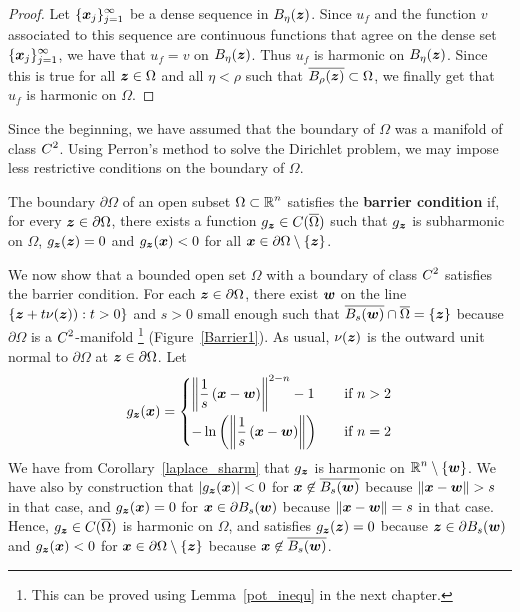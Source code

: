 \begin{proof}
Let $\displaystyle \{{\bm{x}}_j\}_{j=1}^\infty$ be a dense sequence in 
$B_\eta({\bm{z}})$.  Since $u_f$ and the function $v$ associated to
this sequence are continuous functions that agree on the dense set
$\displaystyle \{{\bm{x}}_j\}_{j=1}^\infty$, we have that
$u_f = v$ on $B_\eta({\bm{z}})$.  Thus $u_f$ is harmonic on
$B_\eta({\bm{z}})$.  Since this is true for all ${\bm{z}} \in \Omega$
and all $\eta < \rho$ such that $\overline{B_\rho({\bm{z}})} \subset
\Omega$, we finally get that $u_f$ is harmonic on $\Omega$.
\end{proof}

Since the beginning, we have assumed that the boundary of $\Omega$ was
a manifold of class $\displaystyle C^2$.  Using Perron's method to
solve the Dirichlet problem, we may impose less restrictive conditions
on the boundary of $\Omega$.

\begin{defn}
The boundary $\partial \Omega$ of an open subset
$\displaystyle \Omega \subset \mathbb{R}^n$
satisfies the {\bfseries barrier condition}
if, for every ${\bm{z}} \in \partial \Omega$, there exists a function
$g_{{\bm{z}}} \in C(\overline{\Omega})$ such that
$g_{{\bm{z}}}$ is subharmonic on $\Omega$, $g_{{\bm{z}}}({\bm{z}}) = 0$
and $g_{{\bm{z}}}({\bm{x}}) < 0$ for all
${\bm{x}} \in \partial \Omega \setminus \{{\bm{z}}\}$.
\end{defn}

We now show that a bounded open set $\Omega$ with a boundary of class
$\displaystyle C^2$ satisfies the barrier condition.   For each
${\bm{z}} \in \partial \Omega$, there exist ${\bm{w}}$ on the line
$\displaystyle \{ {\bm{z}} + t\nu({\bm{z}})) : t > 0 \}$
and $s>0$ small enough such that
$\displaystyle \overline{B_s({\bm{w}})} \cap \overline{\Omega} = \{{\bm{z}}\}$
because $\partial \Omega$ is a
$\displaystyle C^2$-manifold \footnote{This can be
proved using Lemma~\ref{pot_inequ} in the next chapter.}
(Figure~\ref{Barrier1}).  As usual, $\nu({\bm{z}})$ is the
outward unit normal to $\partial \Omega$ at
${\bm{z}} \in \partial \Omega$.  Let
\[
g_{{\bm{z}}}({\bm{x}})
= \begin{cases}
\displaystyle \left\| \frac{1}{s}\,({\bm{x}}-{\bm{w}}) \right\|^{2-n} - 1
& \quad \text{if} \ n > 2 \\[0.8em]
\displaystyle
-\ln\left(\left\| \frac{1}{s}\, ({\bm{x}} - {\bm{w}}) \right\|\right)
& \quad \text{if} \ n = 2
\end{cases}
\]
We have from Corollary~\ref{laplace_sharm} that
$g_{{\bm{z}}}$ is harmonic on $\displaystyle \mathbb{R}^n\setminus \{{\bm{w}}\}$.
We have also by construction that
$\displaystyle |g_{{\bm{z}}}({\bm{x}})| < 0$ for
${\bm{x}} \not\in \overline{B_s({\bm{w}})}$ because
$\|{\bm{x}} - {\bm{w}}\| > s$ in that case, and
$\displaystyle g_{{\bm{z}}}({\bm{x}}) = 0$ for
${\bm{x}} \in \partial B_s({\bm{w}})$ because
$\|{\bm{x}} - {\bm{w}}\| = s$ in that case.
Hence, $g_{{\bm{z}}} \in C(\overline{\Omega})$ is harmonic on
$\Omega$, and satisfies $g_{{\bm{z}}}({\bm{z}}) = 0$ because
${\bm{z}} \in \partial B_s({\bm{w}})$ and $g_{{\bm{z}}}({\bm{x}}) < 0$ for 
${\bm{x}} \in \partial \Omega \setminus \{{\bm{z}}\}$ because
${\bm{x}} \not\in \overline{B_s({\bm{w}})}$.

